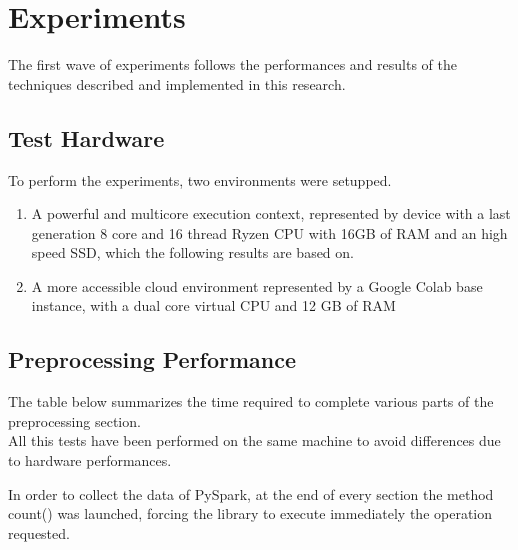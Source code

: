 \documentclass[
	letterpaper, %
	10pt, %
]{class}
\begin{document}



\section{Experiments}

The first wave of experiments follows the performances and results of the techniques described and implemented in this research.

\subsection{Test Hardware}

To perform the experiments, two environments were setupped.
\begin{enumerate}
    \item A powerful and multicore execution context, represented by device with a last generation 8 core and 16 thread Ryzen CPU with 16GB of RAM and an high speed SSD, which the following results are based on.
    \item A more accessible cloud environment represented by a Google Colab base instance, with a dual core virtual CPU and 12 GB of RAM
\end{enumerate}

\subsection{Preprocessing Performance}

The table below summarizes the time required to complete various parts of the preprocessing section.\\
All this tests have been performed on the same machine to avoid differences due to hardware performances.

In order to collect the data of PySpark, at the end of every section the method count() was launched, forcing the library to execute immediately the operation requested.\\
\end{document}

